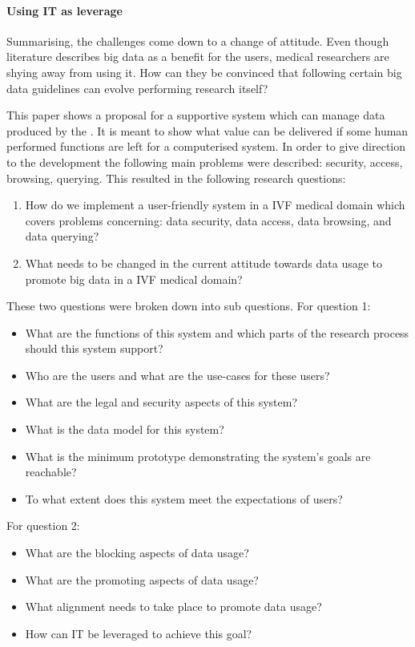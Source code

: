 \paragraph{Using IT as leverage}
Summarising, the challenges come down to a change of attitude.
Even though literature describes big data as a benefit for the users, medical researchers are shying away from using it.
How can they be convinced that following certain big data guidelines can evolve performing research itself?

This paper shows a proposal for a supportive system which can manage data produced by the \project{}.
It is meant to show what value can be delivered if some human performed functions are left for a computerised system.
In order to give direction to the development the following main problems were described: security, access, browsing, querying.
This resulted in the following research questions:

\begin{enumerate}
	\item How do we implement a user-friendly system in a IVF medical domain which covers problems concerning: data security, data access, data browsing, and data querying?
	\item What needs to be changed in the current attitude towards data usage to promote big data in a IVF medical domain?
\end{enumerate}

These two questions were broken down into sub questions. 
For question 1:
\begin{itemize}
	\item What are the functions of this system and which parts of the research process should this system support?
	\item Who are the users and what are the use-cases for these users?
	\item What are the legal and security aspects of this system?
	\item What is the data model for this system?
	\item What is the minimum prototype demonstrating the system's goals are reachable? 
	\item To what extent does this system meet the expectations of users?
\end{itemize}

For question 2:
\begin{itemize}
	\item What are the blocking aspects of data usage?
	\item What are the promoting aspects of data usage?
	\item What alignment needs to take place to promote data usage?
	\item How can IT be leveraged to achieve this goal?
\end{itemize}